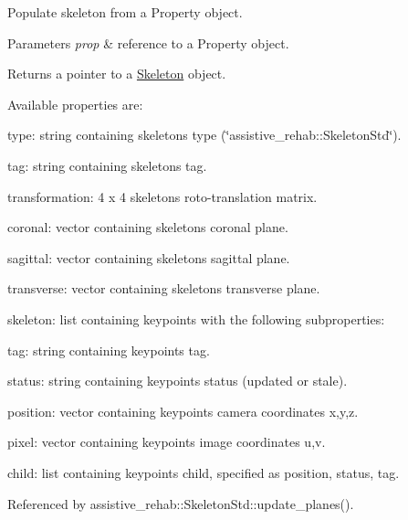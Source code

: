 Populate skeleton from a Property object. 


\begin{DoxyParams}{Parameters}
{\em prop} & reference to a Property object. \\
\hline
\end{DoxyParams}
\begin{DoxyReturn}{Returns}
a pointer to a \hyperlink{classassistive__rehab_1_1Skeleton}{Skeleton} object.
\end{DoxyReturn}
Available properties are\+:
\begin{DoxyItemize}
\item type\+: string containing skeleton\textquotesingle{}s type (\char`\"{}assistive\+\_\+rehab\+::\+Skeleton\+Std\char`\"{}).
\item tag\+: string containing skeleton\textquotesingle{}s tag.
\item transformation\+: 4 x 4 skeleton\textquotesingle{}s roto-\/translation matrix.
\item coronal\+: vector containing skeleton\textquotesingle{}s coronal plane.
\item sagittal\+: vector containing skeleton\textquotesingle{}s sagittal plane.
\item transverse\+: vector containing skeleton\textquotesingle{}s transverse plane.
\item skeleton\+: list containing keypoints with the following subproperties\+:
\begin{DoxyItemize}
\item tag\+: string containing keypoint\textquotesingle{}s tag.
\item status\+: string containing keypoint\textquotesingle{}s status (updated or stale).
\item position\+: vector containing keypoint\textquotesingle{}s camera coordinates x,y,z.
\item pixel\+: vector containing keypoint\textquotesingle{}s image coordinates u,v.
\item child\+: list containing keypoint\textquotesingle{}s child, specified as position, status, tag. 
\end{DoxyItemize}
\end{DoxyItemize}

Referenced by assistive\+\_\+rehab\+::\+Skeleton\+Std\+::update\+\_\+planes().

